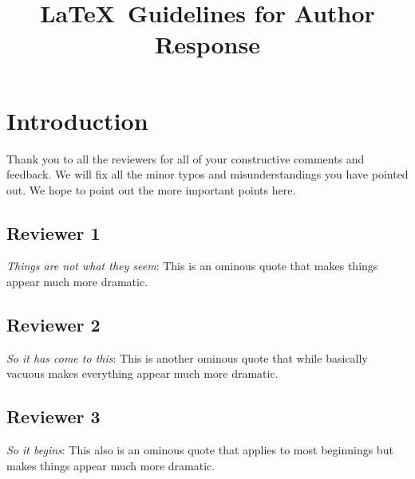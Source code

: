 \documentclass[10pt,twocolumn,letterpaper]{article}
\begin{document}
\title{\LaTeX\ Guidelines for Author Response}  %

\maketitle
\thispagestyle{empty}


\section{Introduction}
Thank you to all the reviewers for all of your constructive comments and feedback.
We will fix all the minor typos and misunderstandings you have pointed out. 
We hope to point out the more important points here.


\subsection{Reviewer 1}
\textit{Things are not what they seem}: This is an ominous quote that makes things appear much more dramatic.

\subsection{Reviewer 2}
\textit{So it has come to this}: This is another ominous quote that while basically vacuous makes everything appear much more dramatic.

\subsection{Reviewer 3}
\textit{So it begins}: This also is an ominous quote that applies to most beginnings but makes things appear much more dramatic.





{\small


}
\end{document}
